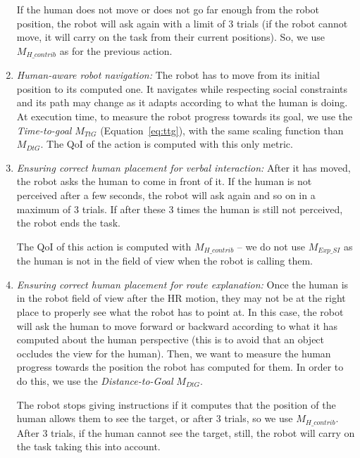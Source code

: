 \documentclass[a4paper,11pt,twoside]{StyleThese}
\begin{document}
\begin{enumerate}[label=(\alph*)]
	If the human does not move or does not go far enough from the robot position, the robot will ask again with a limit of 3 trials (if the robot cannot move, it will carry on the task from their current positions). So, we use $M_{H\_contrib}$ as for the previous action. 
	
	\item \label{list_act:nav} \emph{Human-aware robot navigation: }The robot has to move from its initial position to its computed one. It navigates while respecting social constraints and its path may change as it adapts according to what the human is doing. At execution time, to measure the robot progress towards its goal, we use the \emph{Time-to-goal} $M_{TtG}$ (Equation~\ref{eq:ttg}), with the same scaling function than $M_{DtG}$. The QoI of the action is computed with this only metric. 
	
	\item \label{list_act:correct_place1} \emph{Ensuring correct human placement for verbal interaction: }After it has moved, the robot asks the human to come in front of it. If the human is not perceived after a few seconds, the robot will ask again and so on in a maximum of 3 trials. If after these 3 times the human is still not perceived, the robot ends the task. 
	
	The QoI of this action is computed with $M_{H\_contrib}$ -- we do not use $M_{Exp\_SI}$ as the human is not in the field of view when the robot is calling them.
	
	\item \label{list_act:correct_place2} \emph{Ensuring correct human placement for route explanation: }Once the human is in the robot field of view after the HR motion, they may not be at the right place to properly see what the robot has to point at. In this case, the robot will ask the human to move forward or backward according to what it has computed about the human perspective (\eg this is to avoid that an object occludes the view for the human). Then, we want to measure the human progress towards the position the robot has computed for them. In order to do this, we use the \emph{Distance-to-Goal} $M_{DtG}$.
	
	The robot stops giving instructions if it computes that the position of the human allows them to see the target, or after 3 trials, so we use $M_{H\_contrib}$. After 3 trials, if the human cannot see the target, still, the robot will carry on the task taking this into account.
	
	
\end{enumerate}
\end{document}

